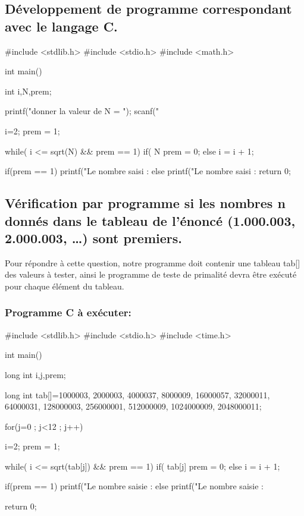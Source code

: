 \documentclass[12pt]{article}
\begin{document}
\subsection{Développement de programme correspondant avec le langage C.}


\begin{sql}
#include <stdlib.h>
#include <stdio.h>
#include <math.h>

int main()
{
	int i,N,prem;

	printf("donner la valeur de N = ");
	scanf("%

	i=2;
	prem = 1;

	while( i <= sqrt(N) && prem == 1){
		if( N%
			prem = 0;
		else
			i = i + 1;
	}

	if(prem == 1)
    {
        printf("Le nombre saisi : %
    }
	else{
        printf("Le nombre saisi : %
	}
return 0;
}
\end{sql}



\subsection{Vérification par programme  si  les  nombres  n  donnés  dans  le tableau de l'énoncé (1.000.003, 2.000.003, …) sont premiers.}

Pour répondre à cette question, notre programme doit contenir une tableau tab[] des valeurs à tester, ainsi le programme de teste de primalité devra être exécuté pour chaque élément du tableau.

\subsubsection{Programme C à exécuter:}

\begin{sql}
#include <stdlib.h>
#include <stdio.h>
#include <time.h>

int main()
{
	long int i,j,prem;

	long int tab[]={1000003, 2000003, 4000037, 8000009, 16000057, 32000011, 64000031, 128000003, 256000001, 512000009,	1024000009,	2048000011};

for(j=0 ; j<12 ; j++)
{
	i=2;
	prem = 1;
	
	while( i <= sqrt(tab[j]) && prem == 1){
		if( tab[j]%
			prem = 0;
		else
			i = i + 1;
	}

	if(prem == 1)
    {
        printf("Le nombre saisie : %
    }
	else{
        printf("Le nombre saisie : %
	}
}
return 0;
}
\end{sql}
\end{document}
